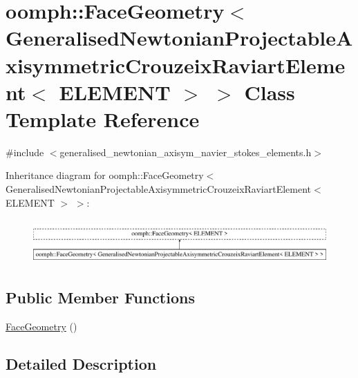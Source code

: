 \hypertarget{classoomph_1_1FaceGeometry_3_01GeneralisedNewtonianProjectableAxisymmetricCrouzeixRaviartElement_3_01ELEMENT_01_4_01_4}{}\section{oomph\+:\+:Face\+Geometry$<$ Generalised\+Newtonian\+Projectable\+Axisymmetric\+Crouzeix\+Raviart\+Element$<$ E\+L\+E\+M\+E\+NT $>$ $>$ Class Template Reference}
\label{classoomph_1_1FaceGeometry_3_01GeneralisedNewtonianProjectableAxisymmetricCrouzeixRaviartElement_3_01ELEMENT_01_4_01_4}


{\ttfamily \#include $<$generalised\+\_\+newtonian\+\_\+axisym\+\_\+navier\+\_\+stokes\+\_\+elements.\+h$>$}

Inheritance diagram for oomph\+:\+:Face\+Geometry$<$ Generalised\+Newtonian\+Projectable\+Axisymmetric\+Crouzeix\+Raviart\+Element$<$ E\+L\+E\+M\+E\+NT $>$ $>$\+:\begin{figure}[H]
\begin{center}
\leavevmode
\includegraphics[height=1.720430cm]{classoomph_1_1FaceGeometry_3_01GeneralisedNewtonianProjectableAxisymmetricCrouzeixRaviartElement_3_01ELEMENT_01_4_01_4}
\end{center}
\end{figure}
\subsection*{Public Member Functions}
\begin{DoxyCompactItemize}
\item 
\hyperlink{classoomph_1_1FaceGeometry_3_01GeneralisedNewtonianProjectableAxisymmetricCrouzeixRaviartElement_3_01ELEMENT_01_4_01_4_ae9c75d10522bdbd05036566cec612f2e}{Face\+Geometry} ()
\end{DoxyCompactItemize}


\subsection{Detailed Description}
